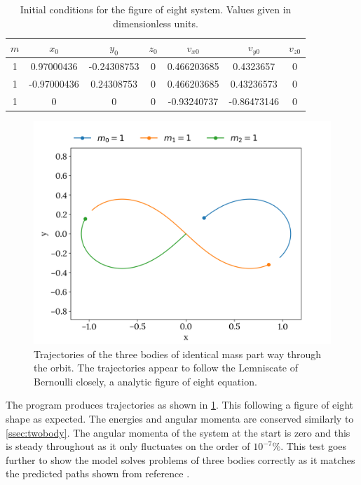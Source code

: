 \documentclass{physics_article_B}
\begin{document}
\begin{table}[H]
 \centering
 \caption{Initial conditions for the figure of eight system. Values given in dimensionless units.}

 \setlength{\tabcolsep}{0.5em}
 \renewcommand{\arraystretch}{1.5}
 \begin{tabular}{|c|c|c|c|c|c|c|}
 \hline
 $m$ & $x_0$ & $y_0$ & $z_0$ & $v_{x0}$ & $v_{y0}$ & $v_{z0}$ \\
 \hline
 1 & 0.97000436 & -0.24308753 & 0 & 0.466203685 & 0.4323657 & 0 \\
 1 & -0.97000436 & 0.24308753 & 0 & 0.466203685 & 0.43236573 & 0 \\
 1 & 0 & 0 & 0 & -0.93240737 & -0.86473146 & 0 \\
 \hline
 \end{tabular}
 \label{tab:figure8init}
\end{table}

\begin{figure}[H]
 \centering
 \includegraphics[width=0.8\linewidth]{figure8.png}
 \caption{Trajectories of the three bodies of identical mass part way through the orbit. The trajectories appear to follow the Lemniscate of Bernoulli closely, a analytic figure of eight equation. }
 \label{fig:figure8}
\end{figure}

The program produces trajectories as shown in \cref{fig:figure8}. This following a figure of eight shape as expected. The energies and angular momenta are conserved similarly to \cref{ssec:twobody}. The angular momenta of the system at the start is zero and this is steady throughout as it only fluctuates on the order of $10^{-7}\%$. This test goes further to show the model solves problems of three bodies correctly as it matches the predicted paths shown from reference \cite{chenciner_remarkable_2000}.
\end{document}
